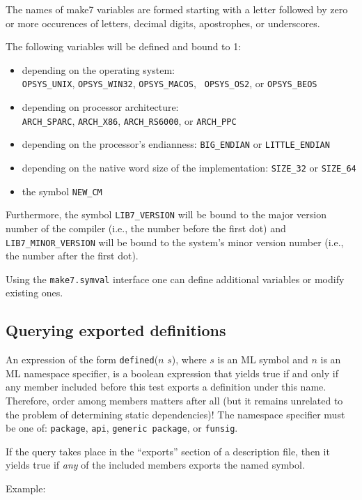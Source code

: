 The names of make7 variables are formed starting with a letter followed
by zero or more occurences of letters, decimal digits, apostrophes, or
underscores.

The following variables will be defined and bound to 1:
\begin{itemize}
\item depending on the operating system: \\
{\tt OPSYS\_UNIX}, {\tt OPSYS\_WIN32}, {\tt OPSYS\_MACOS}, {\tt
OPSYS\_OS2}, or {\tt OPSYS\_BEOS}
\item depending on processor architecture: \\
{\tt ARCH\_SPARC}, {\tt ARCH\_X86}, {\tt ARCH\_RS6000}, or {\tt ARCH\_PPC}
\item depending on the processor's endianness:
{\tt BIG\_ENDIAN} or {\tt LITTLE\_ENDIAN}
\item depending on the native word size of the implementation:
{\tt SIZE\_32} or {\tt SIZE\_64}
\item the symbol {\tt NEW\_CM}
\end{itemize}

Furthermore, the symbol {\tt LIB7\_VERSION} will be bound to the
major version number of the compiler (i.e., the number before the first dot)
and {\tt LIB7\_MINOR\_VERSION} will be bound to the system's minor
version number (i.e., the number after the first dot).

Using the {\tt make7.symval} interface one can define additional
variables or modify existing ones.

\subsection{Querying exported definitions}

An expression of the form {\tt defined}($n$ $s$), where $s$ is an ML
symbol and $n$ is an ML namespace specifier, is a boolean expression
that yields true if and only if any member included before this test
exports a definition under this name.  Therefore, order among members
matters after all (but it remains unrelated to the problem of
determining static dependencies)!  The namespace specifier must be one
of: {\tt package}, {\tt api}, {\tt generic package}, or {\tt funsig}.

If the query takes place in the ``exports'' section of a description
file, then it yields true if {\em any} of the included members exports
the named symbol.

\noindent Example:

